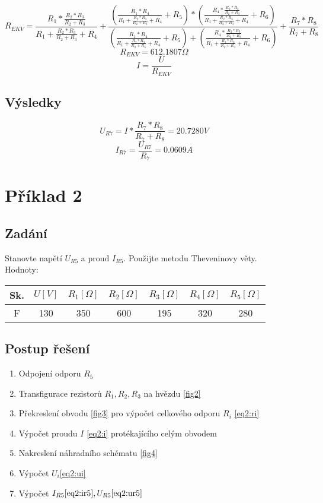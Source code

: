\documentclass[12pt,a4paper,titlepage,final]{article}
\begin{document}
\newcommand{\prvniRdvatri}{\ensuremath{\frac{R_2*R_3}{R_2+R_3}}}
\newcommand{\prvniRsedmosm}{\ensuremath{\frac{R_7*R_8}{R_7+R_8}}}
\newcommand{\prvniRa}{\ensuremath{\frac{R_1*\prvniRdvatri}{R_1+\prvniRdvatri + R_4}}}
\newcommand{\prvniRb}{\ensuremath{\frac{R_1*R_4}{R_1+\prvniRdvatri + R_4}}}
\newcommand{\prvniRc}{\ensuremath{\frac{R_4*\prvniRdvatri}{R_1+\prvniRdvatri + R_4}}}
\begin{equation}\label{eq1:rekv}
R_{EKV} = \prvniRa + \frac{(\prvniRb + R_5)*(\prvniRc+R_6)}{(\prvniRb+R_5)+(\prvniRc+R_6)} + \prvniRsedmosm
\end{equation}
\[R_{EKV} = 612.1807\Omega\]
\[I = \frac{U}{R_{EKV}}\]
\subsection{Výsledky}
\begin{equation}\label{eq1:ur7}
U_{R7} = I * \prvniRsedmosm = 20.7280V
\end{equation}
\begin{equation}\label{eq1:ir7}
I_{R7} = \frac{U_{R7}}{R_7} = 0.0609A
\end{equation}


\section{Příklad 2}
\subsection{Zadání}
Stanovte napětí $U_{R5}$ a proud $I_{R5}$. Použijte metodu Theveninovy věty.\\
Hodnoty:\\
\begin{tabular}{|c|c|c|c|c|c|c|}
\hline
Sk. & $U [V]$ & $R_1 [\Omega]$ & $R_2 [\Omega]$ & $R_3 [\Omega]$ & $R_4 [\Omega]$ & $R_5 [\Omega]$\\
\hline
F & 130 & 350 & 600 & 195 & 320 & 280\\
\hline
\end{tabular}
\subsection{Postup řešení}
\begin{enumerate}
\item Odpojení odporu $R_5$
\item Transfigurace rezistorů $R_1, R_2, R_3$ na hvězdu \ref{fig2}
\item Překreslení obvodu \ref{fig3} pro výpočet celkového odporu $R_i$ \ref{eq2:ri}
\item Výpočet proudu $I$ \ref{eq2:i} protékajícího celým obvodem
\item Nakreslení náhradního schématu \ref{fig4}
\item Výpočet $U_i$\ref{eq2:ui}
\item Výpočet $I_{R5} \ref{eq2:ir5}, U_{R5} \ref{eq2:ur5}$
\end{enumerate}
\end{document}
